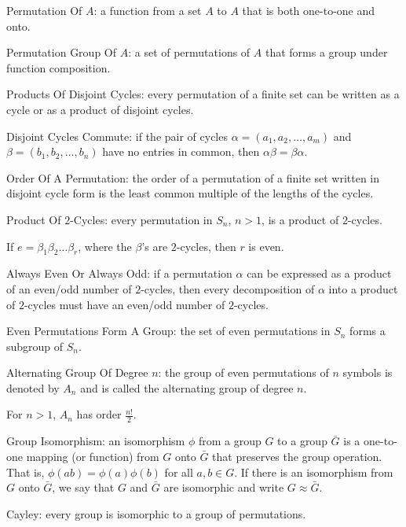 Permutation Of $A$: a function from a set $A$ to $A$ that is both one-to-one and onto.

Permutation Group Of $A$: a set of permutations of $A$ that forms a group under function composition.

Products Of Disjoint Cycles: every permutation of a finite set can be written as a cycle or as a product of disjoint cycles.

Disjoint Cycles Commute: if the pair of cycles $\alpha = (a_1,a_2,\dots,a_m)$ and $\beta = (b_1,b_2,\dots,b_n)$ have no entries in common, then $\alpha \beta = \beta \alpha$.

Order Of A Permutation: the order of a permutation of a finite set written in disjoint cycle form is the least common multiple of the lengths of the cycles.

Product Of $2$-Cycles: every permutation in $S_n$, $n>1$, is a product of $2$-cycles.

If $e=\beta_1 \beta_2 \dots \beta_r$, where the $\beta$'s are $2$-cycles, then $r$ is even.

Always Even Or Always Odd: if a permutation $\alpha$ can be expressed as a product of an even/odd number of $2$-cycles, then every decomposition of $\alpha$ into a product of $2$-cycles must have an even/odd number of $2$-cycles.

Even Permutations Form A Group: the set of even permutations in $S_n$ forms a subgroup of $S_n$.

Alternating Group Of Degree $n$: the group of even permutations of $n$ symbols is denoted by $A_n$ and is called the alternating group of degree $n$.

For $n>1$, $A_n$ has order $\frac{n!}{2}$.

Group Isomorphism: an isomorphism $\phi$ from a group $G$ to a group $\bar{G}$ is a one-to-one mapping (or function) from $G$ onto $\bar{G}$ that preserves the group operation. That is, $\phi (ab)=\phi (a) \phi (b)$ for all $a,b \in G$. If there is an isomorphism from $G$ onto $\bar{G}$, we say that $G$ and $\bar{G}$ are isomorphic and write $G \approx \bar{G}$.

Cayley: every group is isomorphic to a group of permutations.

